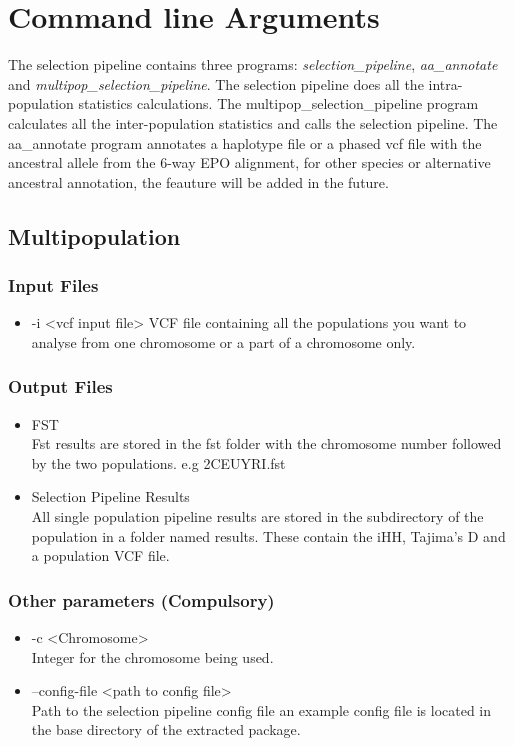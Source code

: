 \documentclass[a4paper,10pt]{article}
\begin{document}
\section{Command line Arguments}
The selection pipeline contains three programs:
\emph{selection\_pipeline}, \emph{aa\_annotate} and
\emph{multipop\_selection_pipeline}. The selection pipeline does all the
intra-population statistics calculations. The multipop\_selection_pipeline program
calculates all the inter-population statistics and calls the selection
pipeline. The aa\_annotate program annotates a haplotype file or a
phased vcf file with the ancestral allele from the 6-way EPO
alignment, for other species or alternative ancestral annotation, the
feauture will be added in the future.

\subsection{Multipopulation}
\subsubsection{Input Files}
\begin{itemize}
\item -i <vcf input file>
VCF file containing all the populations you want to analyse from one chromosome or a part of a chromosome only. 
\end{itemize}
\subsubsection{Output Files}
\begin{itemize}
\item FST \\
Fst results are stored in the fst folder with the chromosome number followed by the two populations. e.g 2CEUYRI.fst
\item Selection Pipeline Results\\
All single population pipeline results are stored in the subdirectory of the population in a folder named results. These contain the iHH, Tajima's D and a population VCF file.
\end{itemize}
\subsubsection{Other parameters (Compulsory)}
\begin{itemize}
\item -c <Chromosome>\\
Integer for the chromosome being used.
\item --config-file <path to config file>\\
Path to the selection pipeline config file an example config file is located in the base directory of the extracted package.
\end{itemize}
\end{document}
